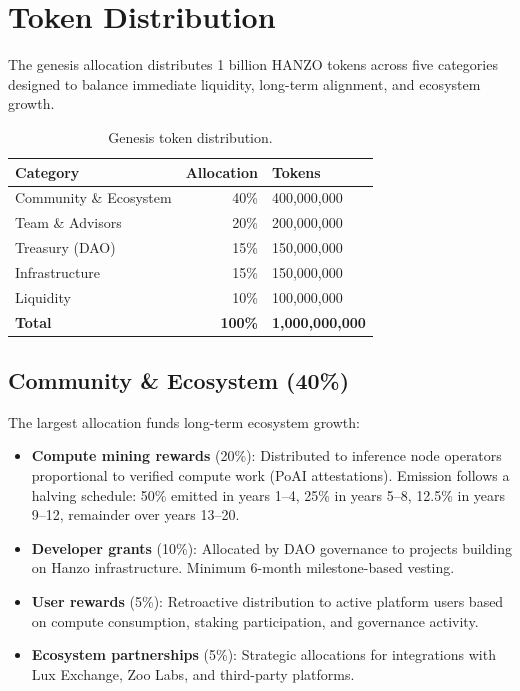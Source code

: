 \section{Token Distribution}

\label{sec:distribution}

The genesis allocation distributes 1 billion HANZO tokens across five categories
designed to balance immediate liquidity, long-term alignment, and ecosystem
growth.

\begin{table}[H]
\centering
\begin{tabular}{lrl}
\toprule
\textbf{Category} & \textbf{Allocation} & \textbf{Tokens} \\
\midrule
Community \& Ecosystem & 40\% & 400,000,000 \\
Team \& Advisors & 20\% & 200,000,000 \\
Treasury (DAO) & 15\% & 150,000,000 \\
Infrastructure & 15\% & 150,000,000 \\
Liquidity & 10\% & 100,000,000 \\
\midrule
\textbf{Total} & \textbf{100\%} & \textbf{1,000,000,000} \\
\bottomrule
\end{tabular}
\caption{Genesis token distribution.}
\label{tab:distribution}
\end{table}

\subsection{Community \& Ecosystem (40\%)}

The largest allocation funds long-term ecosystem growth:

\begin{itemize}[leftmargin=1.1em]
    \item \textbf{Compute mining rewards} (20\%): Distributed to inference node
    operators proportional to verified compute work (PoAI attestations). Emission
    follows a halving schedule: 50\% emitted in years 1--4, 25\% in years 5--8,
    12.5\% in years 9--12, remainder over years 13--20.
    \item \textbf{Developer grants} (10\%): Allocated by DAO governance to
    projects building on Hanzo infrastructure. Minimum 6-month milestone-based
    vesting.
    \item \textbf{User rewards} (5\%): Retroactive distribution to active
    platform users based on compute consumption, staking participation, and
    governance activity.
    \item \textbf{Ecosystem partnerships} (5\%): Strategic allocations for
    integrations with Lux Exchange, Zoo Labs, and third-party platforms.
\end{itemize}

